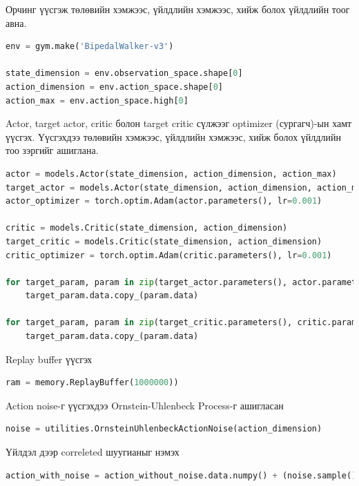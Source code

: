 \documentclass[12pt,A4]{report}
\begin{document}
Орчинг үүсгэж төлөвийн хэмжээс, үйлдлийн хэмжээс, хийж болох үйлдлийн тоог авна.

\begin{lstlisting}[language=Python, caption=Орчин үүсгэх, frame=single]
env = gym.make('BipedalWalker-v3')

state_dimension = env.observation_space.shape[0]
action_dimension = env.action_space.shape[0]
action_max = env.action_space.high[0]
\end{lstlisting}

Actor, target actor, critic болон target critic сүлжээг optimizer (сургагч)-ын хамт үүсгэх. Үүсгэхдээ төлөвийн хэмжээс, үйлдлийн хэмжээс, хийж болох үйлдлийн тоо зэргийг ашиглана.

\begin{lstlisting}[language=Python, caption=Actor critic сүлжээ үүсгэх, frame=single]
actor = models.Actor(state_dimension, action_dimension, action_max)
target_actor = models.Actor(state_dimension, action_dimension, action_max)
actor_optimizer = torch.optim.Adam(actor.parameters(), lr=0.001)

critic = models.Critic(state_dimension, action_dimension)
target_critic = models.Critic(state_dimension, action_dimension)
critic_optimizer = torch.optim.Adam(critic.parameters(), lr=0.001)

for target_param, param in zip(target_actor.parameters(), actor.parameters()):
	target_param.data.copy_(param.data)

for target_param, param in zip(target_critic.parameters(), critic.parameters()):
    target_param.data.copy_(param.data)
\end{lstlisting}

Replay buffer үүсгэх

\begin{lstlisting}[language=Python, caption=Replay buffer үүсгэх, frame=single]
ram = memory.ReplayBuffer(1000000))
\end{lstlisting}

Action noise-г үүсгэхдээ Ornstein-Uhlenbeck Process-г ашигласан

\begin{lstlisting}[language=Python, caption=Шуугиан үүсгэх, frame=single]
noise = utilities.OrnsteinUhlenbeckActionNoise(action_dimension)
\end{lstlisting}

Үйлдэл дээр correleted шуугианыг нэмэх

\begin{lstlisting}[language=Python, caption=Үйлдэл дээр шуугиан нэмэх, frame=single]
action_with_noise = action_without_noise.data.numpy() + (noise.sample() * action_max)
\end{lstlisting}
\end{document}
